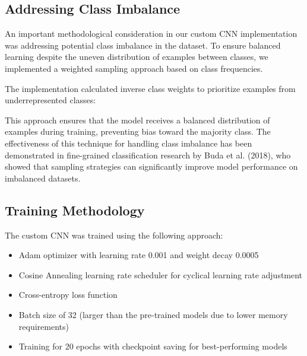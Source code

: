 \documentclass[a4paper,12pt]{article}
\begin{document}
\subsection{Addressing Class Imbalance}

An important methodological consideration in our custom CNN implementation was addressing potential class imbalance in the dataset. To ensure balanced learning despite the uneven distribution of examples between classes, we implemented a weighted sampling approach based on class frequencies.

The implementation calculated inverse class weights to prioritize examples from underrepresented classes:


This approach ensures that the model receives a balanced distribution of examples during training, preventing bias toward the majority class. The effectiveness of this technique for handling class imbalance has been demonstrated in fine-grained classification research by Buda et al. (2018), who showed that sampling strategies can significantly improve model performance on imbalanced datasets.

\subsection{Training Methodology}

The custom CNN was trained using the following approach:

\begin{itemize}
    \item Adam optimizer with learning rate 0.001 and weight decay 0.0005
    \item Cosine Annealing learning rate scheduler for cyclical learning rate adjustment
    \item Cross-entropy loss function
    \item Batch size of 32 (larger than the pre-trained models due to lower memory requirements)
    \item Training for 20 epochs with checkpoint saving for best-performing models
\end{itemize}
\end{document}

